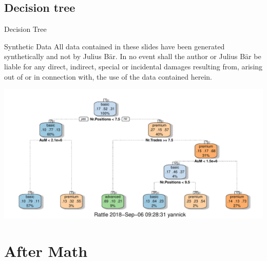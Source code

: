 \documentclass{beamer}\usepackage[]{graphicx}\usepackage[]{color}
\newenvironment{knitrout}{}{} %
\begin{document}
\subsection{Decision tree}
\begin{frame}[fragile]{Decision Tree}
\tiny

{
\begin{block}{\tiny Synthetic Data}
All data contained in these slides have been generated synthetically and not by Julius B\"{a}r. In no event shall the author or Julius B\"{a}r be liable for any direct, indirect, special or incidental damages resulting from, arising out of or in connection with, the use of the data contained herein.
\end{block}
}
\begin{knitrout}
\color{fgcolor}
\includegraphics[width=\linewidth]{figure/plots_tree-1} 

\end{knitrout}

\end{frame}

\section{After Math}
\end{document}
